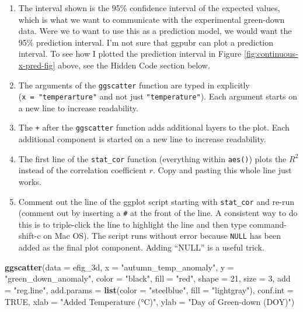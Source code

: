 \documentclass[]{book}
\newenvironment{Shaded}{\begin{snugshade}}{\end{snugshade}}
\newcommand{\DataTypeTok}[1]{\textcolor[rgb]{0.13,0.29,0.53}{#1}}
\newcommand{\DecValTok}[1]{\textcolor[rgb]{0.00,0.00,0.81}{#1}}
\newcommand{\KeywordTok}[1]{\textcolor[rgb]{0.13,0.29,0.53}{\textbf{#1}}}
\newcommand{\NormalTok}[1]{#1}
\newcommand{\OtherTok}[1]{\textcolor[rgb]{0.56,0.35,0.01}{#1}}
\newcommand{\StringTok}[1]{\textcolor[rgb]{0.31,0.60,0.02}{#1}}
\providecommand{\tightlist}{%
  \setlength{\itemsep}{0pt}\setlength{\parskip}{0pt}}
\begin{document}
\begin{enumerate}
\def\labelenumi{\arabic{enumi}.}
\tightlist
\item
  The interval shown is the 95\% confidence interval of the expected values, which is what we want to communicate with the experimental green-down data. Were we to want to use this as a prediction model, we would want the 95\% prediction interval. I'm not sure that ggpubr can plot a prediction interval. To see how I plotted the prediction interval in Figure \ref{fig:continuous-x-pred-fig} above, see the Hidden Code section below.
\item
  The arguments of the \texttt{ggscatter} function are typed in explicitly (\texttt{x\ =\ "temperarture"} and not just \texttt{"temperature"}). Each argument starts on a new line to increase readability.
\item
  The \texttt{+} after the \texttt{ggscatter} function adds additional layers to the plot. Each additional component is started on a new line to increase readability.
\item
  The first line of the \texttt{stat\_cor} function (everything within \texttt{aes()}) plots the \(R^2\) instead of the correlation coefficient \(r\). Copy and pasting this whole line just works.
\item
  Comment out the line of the ggplot script starting with \texttt{stat\_cor} and re-run (comment out by inserting a \texttt{\#} at the front of the line. A consistent way to do this is to triple-click the line to highlight the line and then type command-shift-c on Mac OS). The script runs without error because \texttt{NULL} has been added as the final plot component. Adding ``NULL'' is a useful trick.
\end{enumerate}

\begin{Shaded}
\begin{Highlighting}[]
\KeywordTok{ggscatter}\NormalTok{(}\DataTypeTok{data =}\NormalTok{ efig_3d,}
          \DataTypeTok{x =} \StringTok{"autumn_temp_anomaly"}\NormalTok{,}
          \DataTypeTok{y =} \StringTok{"green_down_anomaly"}\NormalTok{,}
          \DataTypeTok{color =} \StringTok{"black"}\NormalTok{,}
          \DataTypeTok{fill =} \StringTok{"red"}\NormalTok{,}
          \DataTypeTok{shape =} \DecValTok{21}\NormalTok{,}
          \DataTypeTok{size =} \DecValTok{3}\NormalTok{,}
          \DataTypeTok{add =} \StringTok{"reg.line"}\NormalTok{,}
          \DataTypeTok{add.params =} \KeywordTok{list}\NormalTok{(}\DataTypeTok{color =} \StringTok{"steelblue"}\NormalTok{,}
                            \DataTypeTok{fill =} \StringTok{"lightgray"}\NormalTok{),}
          \DataTypeTok{conf.int =} \OtherTok{TRUE}\NormalTok{,}
          \DataTypeTok{xlab =} \StringTok{"Added Temperature (°C)"}\NormalTok{,}
          \DataTypeTok{ylab =} \StringTok{"Day of Green-down (DOY)"}\NormalTok{)}
\end{Highlighting}
\end{Shaded}
\end{document}
